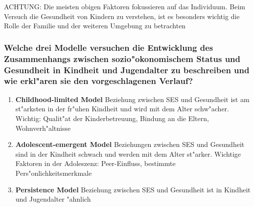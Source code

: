 ACHTUNG: Die meisten obigen Faktoren fokussieren auf das Individuum. Beim Versuch die Gesundheit von Kindern zu verstehen, ist es besonders wichtig die Rolle der Familie und der weiteren Umgebung zu betrachten

\subsubsection{Welche drei Modelle versuchen die Entwicklung des Zusammenhangs zwischen sozio"okonomischem Status und Gesundheit in Kindheit und Jugendalter zu beschreiben und wie erkl"aren sie den vorgeschlagenen Verlauf?}
\begin{enumerate}
        \item \textbf{Childhood-limited Model} Beziehung zwischen SES und Gesundheit ist am st"arksten in der fr"uhen Kindheit und wird mit dem Alter schw"acher. Wichtig: Qualit"at der Kinderbetreuung, Bindung an die Eltern, Wohnverh"altnisse
\item \textbf{Adolescent-emergent Model} Beziehungen zwischen SES und Gesundheit sind in der Kindheit schwach und werden mit dem Alter st"arker. Wichtige Faktoren in der Adoleszenz: Peer-Einfluss, bestimmte Pers"onlichkeitsmerkmale
\item \textbf{Persistence Model} Beziehung zwischen SES und Gesundheit ist in Kindheit und Jugendalter "ahnlich 
\end{enumerate}

